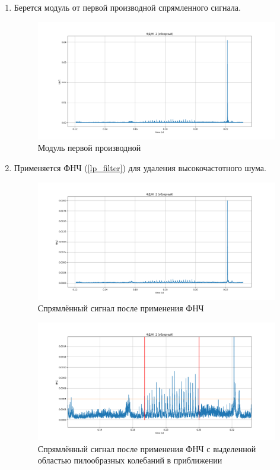 \documentclass[12pt,a4paper]{article}
\begin{document}
\begin{enumerate}
				\item Берется модуль от первой производной спрямленного сигнала.
				\FloatBarrier
				\begin{figure}[h!]
					\centering\includegraphics[width=1\linewidth]{./../plots/signal_1st_der_abs.png}
					\caption{Модуль первой производной}
				\end{figure}
				\FloatBarrier
				
				\item Применяется ФНЧ (\ref{lp_filter}) для удаления высокочастотного шума.
				\FloatBarrier
				\begin{figure}[h!]
					\centering\includegraphics[width=1\linewidth]{./../plots/signal_lp_filtered.png}
					\caption{Спрямлённый сигнал после применения ФНЧ}
				\end{figure}
				\FloatBarrier
				
				\FloatBarrier
				\begin{figure}[h!]
					\centering\includegraphics[width=1\linewidth]{./../plots/signal_lp_filtered_zoomed_v2.png}
					\caption{Спрямлённый сигнал после применения ФНЧ с выделенной областью пилообразных колебаний в приближении}
				\end{figure}
				\FloatBarrier
				

\end{enumerate}
\end{document}
